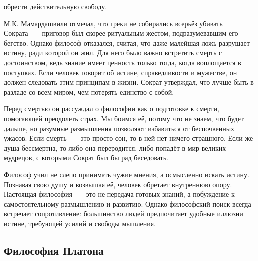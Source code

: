 обрести действительную свободу. 

М.К. Мамардашвили отмечал, что греки не собирались всерьёз убивать Сократа~---~приговор был скорее ритуальным жестом, подразумевавшим его бегство. Однако философ отказался, считая, что даже малейшая ложь разрушает истину, ради которой он жил. Для него было важно встретить смерть с достоинством, ведь знание имеет ценность только тогда, когда воплощается в поступках. Если человек говорит об истине, справедливости и мужестве, он должен следовать этим принципам в жизни. Сократ утверждал, что лучше быть в разладе со всем миром, чем потерять единство с собой.

Перед смертью он рассуждал о философии как о подготовке к смерти, помогающей преодолеть страх. Мы боимся её, потому что не знаем, что будет дальше, но разумные размышления позволяют избавиться от беспочвенных ужасов. Если смерть~---~это просто сон, то в ней нет ничего страшного. Если же душа бессмертна, то либо она переродится, либо попадёт в мир великих мудрецов, с которыми Сократ был бы рад беседовать.

Философ учил не слепо принимать чужие мнения, а осмысленно искать истину. Познавая свою душу и возвышая её, человек обретает внутреннюю опору. Настоящая философия~---~это не передача готовых знаний, а побуждение к самостоятельному размышлению и развитию. Однако философский поиск всегда встречает сопротивление: большинство людей предпочитает удобные иллюзии истине, требующей усилий и свободы мышления.

\subsection{Философия Платона}


